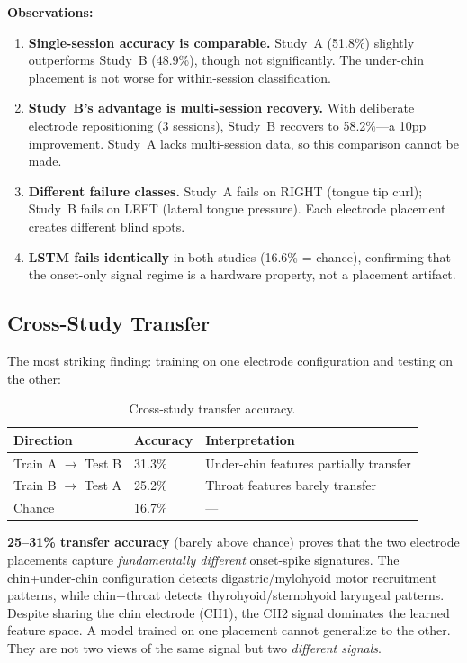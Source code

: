\documentclass[11pt, a4paper]{article}
\begin{document}
\textbf{Observations:}
\begin{enumerate}
    \item \textbf{Single-session accuracy is comparable.} Study~A (51.8\%) slightly outperforms Study~B (48.9\%), though not significantly. The under-chin placement is not worse for within-session classification.
    \item \textbf{Study~B's advantage is multi-session recovery.} With deliberate electrode repositioning (3 sessions), Study~B recovers to 58.2\%---a 10pp improvement. Study~A lacks multi-session data, so this comparison cannot be made.
    \item \textbf{Different failure classes.} Study~A fails on RIGHT (tongue tip curl); Study~B fails on LEFT (lateral tongue pressure). Each electrode placement creates different blind spots.
    \item \textbf{LSTM fails identically} in both studies (16.6\% = chance), confirming that the onset-only signal regime is a hardware property, not a placement artifact.
\end{enumerate}

\subsection{Cross-Study Transfer}

The most striking finding: training on one electrode configuration and testing on the other:

\begin{table}[ht]
\centering
\caption{Cross-study transfer accuracy.}
\label{tab:crossstudy}
\begin{tabular}{@{}lll@{}}
\toprule
Direction & Accuracy & Interpretation \\
\midrule
Train A $\to$ Test B & 31.3\% & Under-chin features partially transfer \\
Train B $\to$ Test A & 25.2\% & Throat features barely transfer \\
\midrule
Chance & 16.7\% & --- \\
\bottomrule
\end{tabular}
\end{table}

\textbf{25--31\% transfer accuracy} (barely above chance) proves that the two electrode placements capture \emph{fundamentally different} onset-spike signatures. The chin+under-chin configuration detects digastric/mylohyoid motor recruitment patterns, while chin+throat detects thyrohyoid/sternohyoid laryngeal patterns. Despite sharing the chin electrode (CH1), the CH2 signal dominates the learned feature space. A model trained on one placement cannot generalize to the other. They are not two views of the same signal but two \emph{different signals}.
\end{document}
